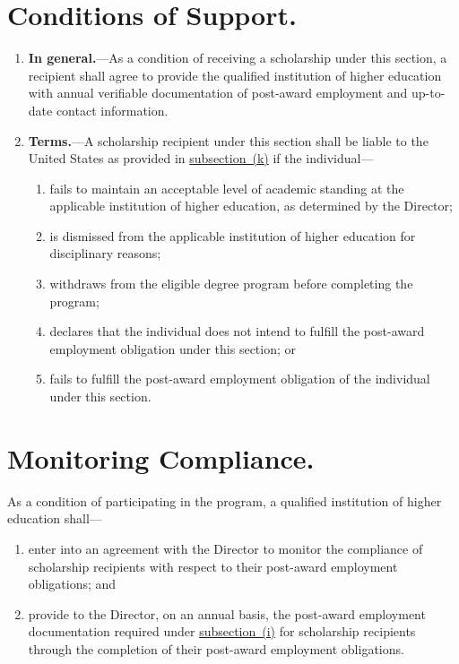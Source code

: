 \documentclass{article}
\begin{document}
    \section{Conditions of Support.}\label{sec:support}
\begin{enumerate}
            \item {\bf In general.}---As a condition of receiving a scholarship 
        under this section, a recipient shall agree to provide the 
        qualified institution of higher education with annual 
        verifiable documentation of post-award employment and up-to-date contact information.
            \item {\bf Terms.}\label{enum:terms}---A scholarship recipient under this section 
        shall be liable to the United States as provided in \hyperref[sec:amount]{subsection~(k)} if the individual---
\begin{enumerate}
                    \item fails to maintain an acceptable level of 
                academic standing at the applicable institution of 
                higher education, as determined by the Director;
                    \item is dismissed from the applicable institution of 
                higher education for disciplinary reasons;
                    \item withdraws from the eligible degree program 
                before completing the program;
                    \item \label{enum:postaward}declares that the individual does not intend to 
                fulfill the post-award employment obligation under this 
                section; or
                    \item fails to fulfill the post-award employment 
                obligation of the individual under this section.
\end{enumerate}
\end{enumerate}
    \section{Monitoring Compliance.}As a condition of participating in the 
program, a qualified institution of higher education shall---
\begin{enumerate}
            \item enter into an agreement with the Director to monitor 
        the compliance of scholarship recipients with respect to their 
        post-award employment obligations; and
            \item provide to the Director, on an annual basis, the post-award employment documentation required under \hyperref[sec:support]{subsection~(i)} 
        for scholarship recipients through the completion of their 
        post-award employment obligations.
\end{enumerate}
\end{document}
